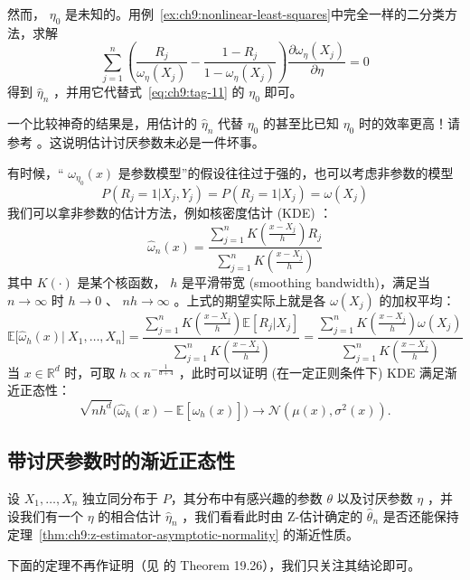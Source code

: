 \begin{example}[缺失响应回归]
然而， $\eta_0$ 是未知的。用例~\ref{ex:ch9:nonlinear-least-squares}中完全一样的二分类方法，求解 
$$\sum_{j=1}^n \left( \frac{R_j}{\omega_\eta(X_j)} - \frac{1-R_j}{1-\omega_\eta(X_j)} \right) \frac{\partial \omega_\eta(X_j)}{\partial \eta} = 0$$
得到 $\widehat\eta_n$ ，并用它代替式~\eqref{eq:ch9:tag-11} 的 $\eta_0$ 即可。

\end{example}

\begin{remark}
一个比较神奇的结果是，用估计的 $\widehat\eta_n$ 代替 $\eta_0$ 的甚至比已知 $\eta_0$ 时的效率更高！请参考 \cite{chenleungqin2008}。这说明估计讨厌参数未必是一件坏事。
\end{remark}

有时候，`` $\omega_{\eta_0}(x)$ 是参数模型''的假设往往过于强的，也可以考虑非参数的模型 \[ P(R_j=1|X_j,Y_j)=P(R_j=1|X_j)=\omega(X_j) \]我们可以拿非参数的估计方法，例如核密度估计 (KDE) ：\[\widehat\omega_n(x)=\frac{\sum_{j=1}^nK\left(\frac{x-X_j}{h}\right)R_j}{\sum_{j=1}^nK\left(\frac{x-X_j}{h}\right)}\]
其中 $K(\cdot)$ 是某个核函数， $h$ 是平滑带宽 (smoothing bandwidth)，满足当 $n\to \infty$ 时 $h\to 0$ 、 $nh\to \infty$ 。上式的期望实际上就是各 $\omega(X_j)$ 的加权平均：\[\mathbb{E}\bigl[\widehat{\omega}_h(x) |\ X_1,\dots,X_n\bigr] = \frac{\sum_{j=1}^n K\!\left(\frac{x-X_j}{h}\right) \mathbb{E}[R_j | X_j]}{\sum_{j=1}^n K\!\left(\frac{x-X_j}{h}\right)} = \frac{\sum_{j=1}^n K\!\left(\frac{x-X_j}{h}\right) \omega(X_j)}{\sum_{j=1}^n K\!\left(\frac{x-X_j}{h}\right)}\]
当 $x\in\mathbb R^d$ 时，可取 $h\propto n^{-\frac{1}{d+4}}$ ，此时可以证明 (在一定正则条件下) KDE 满足渐近正态性：
\[
\sqrt{nh^d}\big(\widehat\omega_h(x)-\mathbb{E}[\widehat\omega_h(x)]\big)\to \mathcal N(\mu(x),\sigma^2(x)).
\]


\subsection{带讨厌参数时的渐近正态性}

设 $X_1,\dots,X_n$ 独立同分布于 $P$，其分布中有感兴趣的参数 $\theta$ 以及讨厌参数 $\eta$ ，并设我们有一个 $\eta$ 的相合估计 $\widehat\eta_n$ ，我们看看此时由 Z-估计确定的 $\widehat\theta_n$ 是否还能保持定理~\ref{thm:ch9:z-estimator-asymptotic-normality} 的渐近性质。

下面的定理不再作证明（见 \cite{vandervaart1998} 的 Theorem 19.26），我们只关注其结论即可。

